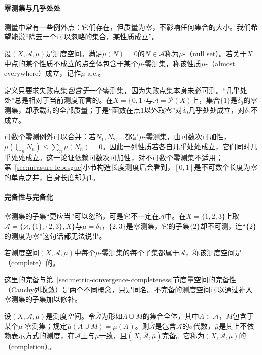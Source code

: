 \paragraph{零测集与几乎处处}
测量中常有一些例外点：它们存在，但质量为零，不影响任何集合的大小。我们希望能说“除去一个可以忽略的集合，某性质成立”。

\begin{definition}[零测集与几乎处处]
\label{def:measure-null-set}
设$(X,\mathcal A,\mu)$是测度空间。满足$\mu(N)=0$的$N\in\mathcal A$称为$\mu$-（null set）。若关于$X$中点的某个性质不成立的点全体包含于某个$\mu$-零测集，称该性质$\mu$-（almost everywhere）成立，记作$\mu$-a.e.。
\end{definition}

定义只要求失败点集\emph{包含于}一个零测集，因为失败点集本身未必可测。“几乎处处”总是相对于当前测度而言的。在$X=\{0,1\}$与$\mathcal A=\mathcal P(X)$上，集合$\{1\}$是$\delta_0$的零测集，却承载$\delta_1$的全部质量；于是“函数在点$1$以外取零”对$\delta_0$几乎处处成立，对$\delta_1$不成立。

可数个零测例外可以合并：若$N_1,N_2,\dots$都是$\mu$-零测集，由可数次可加性，$\mu(\bigcup_nN_n)\le\sum_n\mu(N_n)=0$。因此一列性质若各自几乎处处成立，它们同时几乎处处成立。这一论证依赖可数次可加性，对不可数个零测集不适用；第~\ref{sec:measure-lebesgue}小节构造长度测度后会看到，$[0,1]$是不可数个长度为零的单点之并，自身长度却为$1$。

\paragraph{完备性与完备化}
零测集的子集“更应当”可以忽略，可是它不一定在$\mathcal A$中。在$X=\{1,2,3\}$上取$\mathcal A=\{\varnothing,\{1\},\{2,3\},X\}$与$\mu=\delta_1$，$\{2,3\}$是零测集，它的子集$\{2\}$却不可测，连“$\{2\}$的测度为零”这句话都无法说出。

\begin{definition}[完备测度空间]
\label{def:measure-complete}
若测度空间$(X,\mathcal A,\mu)$中每个$\mu$-零测集的每个子集都属于$\mathcal A$，称该测度空间是（complete）的。
\end{definition}

这里的完备与第~\ref{sec:metric-convergence-completeness}节度量空间的完备性（Cauchy列收敛）是两个不同概念，只是同名。不完备的测度空间可以通过补入零测集的子集加以修补。

\begin{theorem}[测度空间的完备化]
\label{thm:measure-completion}
设$(X,\mathcal A,\mu)$是测度空间。令$\overline{\mathcal A}$为形如$A\cup M$的集合全体，其中$A\in\mathcal A$，$M$包含于某个$\mu$-零测集；规定$\overline\mu(A\cup M)=\mu(A)$。则$\overline{\mathcal A}$是包含$\mathcal A$的$\sigma$代数，$\overline\mu$是其上不依赖表示方式的测度，在$\mathcal A$上与$\mu$一致，且$(X,\overline{\mathcal A},\overline\mu)$完备。它称为$(X,\mathcal A,\mu)$的（completion）。
\end{theorem}

